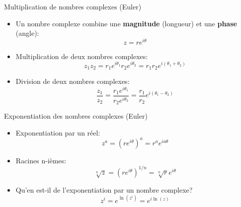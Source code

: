 \documentclass[aspectratio=169,12pt]{beamer}
\begin{document}
\begin{frame}{Multiplication de nombres complexes (Euler)}

  \begin{center}
  \begin{itemize}
    \item Un nombre complexe combine une \textbf{magnitude} (longueur) et une \textbf{phase} (angle):
    \begin{equation*}
      z = r e^{i\theta}
    \end{equation*}
    \item Multiplication de deux nombres complexes:
    \begin{equation*}
      z_1 z_2 = r_1 e^{i\theta_1} r_2 e^{i\theta_2} = r_1 r_2 e^{i(\theta_1+\theta_2)}
    \end{equation*}
    \item Division de deux nombres complexes:
    \begin{equation*}
      \frac{z_1}{z_2} = \frac{r_1 e^{i\theta_1}}{r_2 e^{i\theta_2}} = \frac{r_1}{r_2} e^{i(\theta_1-\theta_2)}
    \end{equation*}
  \end{itemize}
  \end{center}

\end{frame}

\begin{frame}{Exponentiation des nombres complexes (Euler)}

  \begin{center}
  \begin{itemize}
    \item Exponentiation par un réel:
    \begin{equation*}
      z^a = \left( r e^{i\theta} \right)^a = r^a e^{ia\theta}
    \end{equation*}
    \item Racines n-ièmes:
    \begin{equation*}
      \sqrt[n]{z} = \left( r e^{i\theta} \right) ^{1/n} = \sqrt[n]{r} e^{i\theta}
    \end{equation*}
    \bigskip
    \item Qu'en est-il de l'exponentiation par un nombre complexe?
    \begin{equation*}
      z^i = e^{\ln(z^i)} = e^{i\ln(z)}
    \end{equation*}
  \end{itemize}
  \end{center}

\end{frame}
\end{document}
